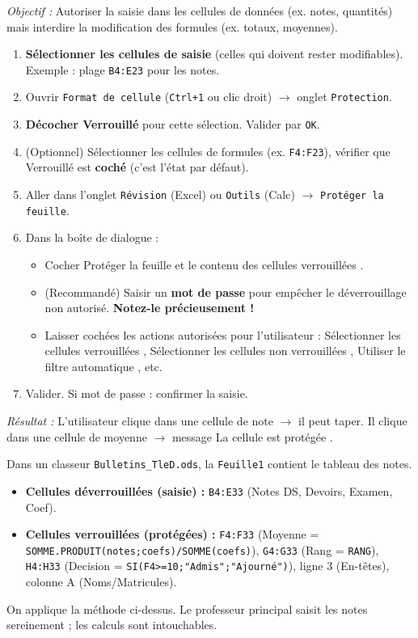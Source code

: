 \documentclass[11pt]{article}
\begin{document}
\begin{methode}
\emph{Objectif :} Autoriser la saisie dans les cellules de données (ex. notes, quantités) mais interdire la modification des formules (ex. totaux, moyennes).
\begin{enumerate}
    \item \textbf{Sélectionner les cellules de saisie} (celles qui doivent rester modifiables). Exemple : plage \texttt{B4:E23} pour les notes.
    \item Ouvrir \texttt{Format de cellule} (\texttt{Ctrl+1} ou clic droit) $\rightarrow$ onglet \texttt{Protection}.
    \item \textbf{Décocher \og Verrouillé \fg} pour cette sélection. Valider par \texttt{OK}.
    \item (Optionnel) Sélectionner les cellules de formules (ex. \texttt{F4:F23}), vérifier que \og Verrouillé \fg est \textbf{coché} (c'est l'état par défaut).
    \item Aller dans l'onglet \texttt{Révision} (Excel) ou \texttt{Outils} (Calc) $\rightarrow$ \texttt{Protéger la feuille}.
    \item Dans la boîte de dialogue :
    \begin{itemize}
        \item Cocher \og Protéger la feuille et le contenu des cellules verrouillées \fg.
        \item (Recommandé) Saisir un \textbf{mot de passe} pour empêcher le déverrouillage non autorisé. \textbf{Notez-le précieusement !}
        \item Laisser cochées les actions autorisées pour l'utilisateur : \og Sélectionner les cellules verrouillées \fg, \og Sélectionner les cellules non verrouillées \fg, \og Utiliser le filtre automatique \fg, etc.
    \end{itemize}
    \item Valider. Si mot de passe : confirmer la saisie.
\end{enumerate}
\emph{Résultat :} L'utilisateur clique dans une cellule de note $\rightarrow$ il peut taper. Il clique dans une cellule de moyenne $\rightarrow$ message \og La cellule est protégée \fg.
\end{methode}

\begin{exemplebox}
Dans un classeur \texttt{Bulletins\_TleD.ods}, la \texttt{Feuille1} contient le tableau des notes.
\begin{itemize}
    \item \textbf{Cellules déverrouillées (saisie) :} \texttt{B4:E33} (Notes DS, Devoirs, Examen, Coef).
    \item \textbf{Cellules verrouillées (protégées) :} \texttt{F4:F33} (Moyenne = \texttt{SOMME.PRODUIT(notes;coefs)/SOMME(coefs)}), \texttt{G4:G33} (Rang = \texttt{RANG}), \texttt{H4:H33} (Decision = \texttt{SI(F4>=10;"Admis";"Ajourné")}), ligne 3 (En-têtes), colonne A (Noms/Matricules).
\end{itemize}
On applique la méthode ci-dessus. Le professeur principal saisit les notes sereinement ; les calculs sont intouchables.
\end{exemplebox}
\end{document}
